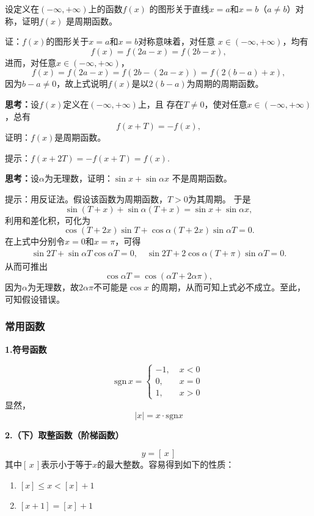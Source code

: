 \bs
\egz 设定义在$(-\infty,+\infty)$上的函数$f(x)$
的图形关于直线$x=a$和$x=b$（$a\ne b$）对称，证明$f(x)$
是周期函数。

证：$f(x)$的图形关于$x=a$和$x=b$对称意味着，对任意
$x\in(-\infty,+\infty)$，均有
$$f(x)=f(2a-x)=f(2b-x),$$
进而，对任意$x\in(-\infty,+\infty)$，
$$f(x)=f(2a-x)=f(2b-(2a-x))=f(2(b-a)+x),$$
因为$b-a\ne0$，故上式说明$f(x)$是以$2(b-a)$为周期的周期函数。\fin

\bs
{\bf 思考：}设$f(x)$定义在$(-\infty,+\infty)$上，且
存在$T\ne 0$，使对任意$x\in(-\infty,+\infty)$，总有
$$f(x+T)=-f(x),$$
证明：$f(x)$是周期函数。

\ifhint
提示：$f(x+2T)=-f(x+T)=f(x)$.
\fi

\bs
{\bf 思考：}设$\alpha$为无理数，证明：$\sin x+\sin\alpha x$
不是周期函数。

\ifhint
提示：用反证法。假设该函数为周期函数，$T>0$为其周期。
于是
$$\sin(T+x)+\sin\alpha(T+x)=\sin x+\sin\alpha x,$$
利用和差化积，可化为
$$\cos(T+2x)\sin T+\cos\alpha(T+2x)\sin\alpha T=0.$$
在上式中分别令$x=0$和$x=\pi$，可得
\begin{align*}
	\sin2T+\sin\alpha T\cos\alpha T=0,
	\quad
	\sin2T+2\cos\alpha(T+\pi)\sin\alpha T=0.
\end{align*}
从而可推出
$$\cos\alpha T=\cos(\alpha T+2\alpha\pi),$$
因为$\alpha$为无理数，故$2\alpha\pi$不可能是$\cos x$
的周期，从而可知上式必不成立。至此，可知假设错误。
\fi

\subsubsection{常用函数}

{\bf 1.符号函数}

$$\mathrm{sgn}\,x =\left\{
\begin{array}{rl}
-1,\;&x<0 \\
0,\;&x=0 \\
1,\;&x>0
\end{array}
\right.$$
显然，
$$|x|=x \cdot\mathrm{sgn} x$$
	
{\bf 2.（下）取整函数（阶梯函数）}

$$y=\left[ \,x\, \right]$$
其中$[\,x\,]$表示小于等于$x$的最大整数。容易得到如下的性质：
\begin{enumerate}[(1)]
  \setlength{\itemindent}{1cm}
  \item $[x]\leq x<[x]+1$
  \item $[x+1]=[x]+1$
\end{enumerate}

